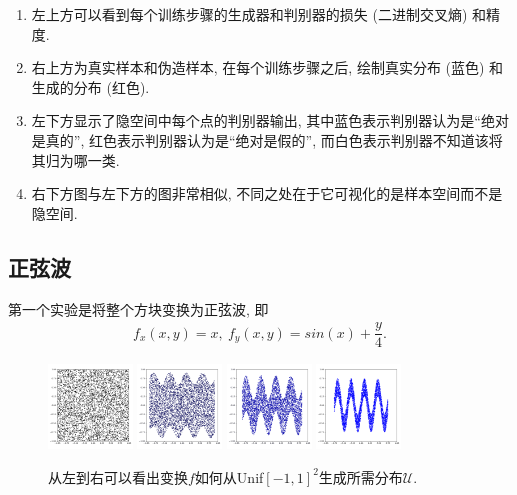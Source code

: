 \documentclass[lang=cn,11pt]{elegantpaper}
\begin{document}
\begin{enumerate}
	\item 左上方可以看到每个训练步骤的生成器和判别器的损失 (二进制交叉熵) 和精度.
	\item 右上方为真实样本和伪造样本, 在每个训练步骤之后, 绘制真实分布 (蓝色) 和生成的分布 (红色).
	\item 左下方显示了隐空间中每个点的判别器输出, 其中蓝色表示判别器认为是“绝对是真的”, 红色表示判别器认为是“绝对是假的”, 而白色表示判别器不知道该将其归为哪一类. 
	\item 右下方图与左下方的图非常相似, 不同之处在于它可视化的是样本空间而不是隐空间. 
\end{enumerate}

\subsection{正弦波}

第一个实验是将整个方块变换为正弦波, 即
\begin{align*}
	f_x(x,y)=x,\ f_y(x,y)=sin(x)+\dfrac{y}{4}.
\end{align*}

\begin{figure}[hbt]
\centering
  \includegraphics[width=0.2\textwidth]{sin_1_1}  
  \includegraphics[width=0.2\textwidth]{sin_1_2}
  \includegraphics[width=0.2\textwidth]{sin_1_3}
  \includegraphics[width=0.2\textwidth]{sin_1_4}
  \caption{从左到右可以看出变换$f$如何从Unif$[-1,1]^2$生成所需分布$\mathcal U$.}
\end{figure}
\end{document}
